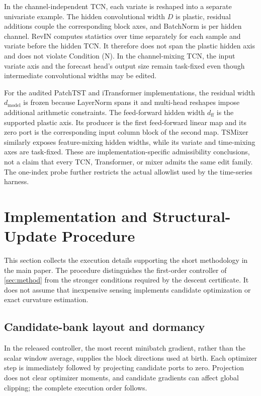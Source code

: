 \documentclass[10pt]{article}
\theoremstyle{paper}
\begin{document}
In the channel-independent TCN, each variate is reshaped into a separate univariate example. The hidden convolutional width $D$ is plastic, residual additions couple the corresponding block axes, and BatchNorm is per hidden channel. RevIN computes statistics over time separately for each sample and variate before the hidden TCN. It therefore does not span the plastic hidden axis and does not violate Condition (N). In the channel-mixing TCN, the input variate axis and the forecast head's output size remain task-fixed even though intermediate convolutional widths may be edited.

For the audited PatchTST and iTransformer implementations, the residual width $d_{\mathrm{model}}$ is frozen because LayerNorm spans it and multi-head reshapes impose additional arithmetic constraints. The feed-forward hidden width $d_{\mathrm{ff}}$ is the supported plastic axis. Its producer is the first feed-forward linear map and its zero port is the corresponding input column block of the second map. TSMixer similarly exposes feature-mixing hidden widths, while its variate and time-mixing axes are task-fixed. These are implementation-specific admissibility conclusions, not a claim that every TCN, Transformer, or mixer admits the same edit family. The one-index probe further restricts the actual allowlist used by the time-series harness.

\section{Implementation and Structural-Update Procedure}
\label{app:implementation}
This section collects the execution details supporting the short methodology in the main paper. The procedure distinguishes the first-order controller of \cref{sec:method} from the stronger conditions required by the descent certificate. It does not assume that inexpensive sensing implements candidate optimization or exact curvature estimation.

\subsection{Candidate-bank layout and dormancy}
\label{app:candidate-bank}
In the released controller, the most recent minibatch gradient, rather than the scalar window average, supplies the block directions used at birth. Each optimizer step is immediately followed by projecting candidate ports to zero. Projection does not clear optimizer moments, and candidate gradients can affect global clipping; the complete execution order follows.
\end{document}
